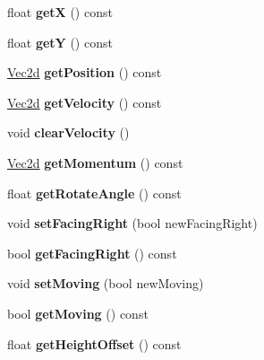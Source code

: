 \begin{DoxyCompactItemize}
\mbox{\label{classEntity_a43a066e3ab4376eb6afbade526c2d1e2}} 
float {\bfseries getX} () const
\item 
\mbox{\label{classEntity_a1628120ebbd5b236a029eaa4a9547313}} 
float {\bfseries getY} () const
\item 
\mbox{\label{classEntity_ae576fe2565d82517b75e13c657bfde1c}} 
\hyperlink{classVec2d}{Vec2d} {\bfseries get\+Position} () const
\item 
\mbox{\label{classEntity_ab6e2e3c19138a036251975ae1e469bac}} 
\hyperlink{classVec2d}{Vec2d} {\bfseries get\+Velocity} () const
\item 
\mbox{\label{classEntity_ab2d8fe89e4ef7e0b8d0e173912d406f3}} 
void {\bfseries clear\+Velocity} ()
\item 
\mbox{\label{classEntity_aca2f5a39eca133693a71e5c76539d415}} 
\hyperlink{classVec2d}{Vec2d} {\bfseries get\+Momentum} () const
\item 
\mbox{\label{classEntity_a2dc7c3c12feca8fbdcb25d9af6ae8813}} 
float {\bfseries get\+Rotate\+Angle} () const
\item 
\mbox{\label{classEntity_a65766729c9b97fb6c76b10ee7c9dcdd8}} 
void {\bfseries set\+Facing\+Right} (bool new\+Facing\+Right)
\item 
\mbox{\label{classEntity_aac8d455337ae477d0866b6f83d7dbe1f}} 
bool {\bfseries get\+Facing\+Right} () const
\item 
\mbox{\label{classEntity_a1cae2076343e59d470ba90363ee007a1}} 
void {\bfseries set\+Moving} (bool new\+Moving)
\item 
\mbox{\label{classEntity_a83a87ee8c35782d6924f8c9b84baa5ef}} 
bool {\bfseries get\+Moving} () const
\item 
\mbox{\label{classEntity_ae5bdd11f7365c361241d858115af9d72}} 
float {\bfseries get\+Height\+Offset} () const
\item 
\mbox{\label{classEntity_a3cebdaabe1cd936c2043e9784b8d1b17}} 

\end{DoxyCompactItemize}
